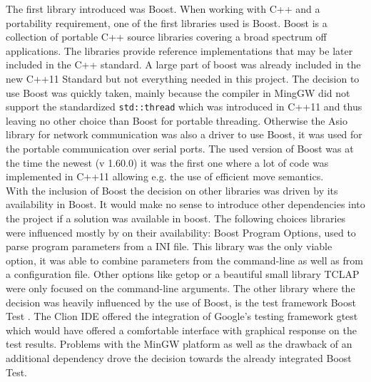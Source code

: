 The first library introduced was Boost. When working with C++ and a portability requirement, one of the first libraries used is Boost. Boost is a collection of portable C++ source libraries covering a broad spectrum off applications. The libraries provide reference implementations that may be later included in the C++ standard. A large part of boost was already included in the new C++11 Standard \cite{cpp_std} but not everything needed in this project. The decision to use Boost was quickly taken, mainly because the compiler in MingGW did not support the standardized \texttt{std::thread} which was introduced in C++11 and thus leaving no other choice than Boost for portable threading. Otherwise the Asio library for network communication was also a driver to use Boost, it was used for the portable communication over serial ports. The used version of Boost was at the time the newest (v 1.60.0) it was the first one where a lot of code was implemented in C++11 allowing e.g. the use of efficient move semantics.\\
With the inclusion of Boost the decision on other libraries was driven by its availability in Boost. It would make no sense to introduce other dependencies into the project if a solution was available in boost. The following choices libraries were influenced mostly by on their availability: Boost Program Options, used to parse program parameters from a INI file. This library was the only viable option, it was able to combine parameters from the command-line as well as from a configuration file. Other options like getop \cite{getop} or a beautiful small library TCLAP \cite{tclap} were only focused on the command-line arguments. The other library where the decision was heavily influenced by the use of Boost, is the test framework Boost Test \cite{boost_test}. The Clion IDE offered the integration of Google's testing framework gtest \cite{gtest} which would have offered a comfortable interface with graphical response on the test results. Problems with the MinGW platform as well as the drawback of an additional dependency drove the decision towards the already integrated Boost Test.

